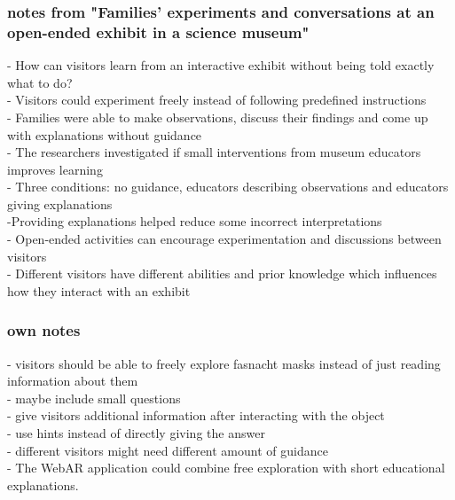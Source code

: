 \subsubsection{notes from "Families' experiments and conversations at an open-ended exhibit in a science museum"}
- How can visitors learn from an interactive exhibit without being told exactly what to do?
\\
- Visitors could experiment freely instead of following predefined instructions
\\
- Families were able to make observations, discuss their findings and come up with explanations without guidance
\\
- The researchers investigated if small interventions from museum educators improves learning
\\
- Three conditions: no guidance, educators describing observations and educators giving explanations
\\
-Providing explanations helped reduce some incorrect interpretations
\\
- Open-ended activities can encourage experimentation and discussions between visitors
\\
- Different visitors have different abilities and prior knowledge which influences how they interact with an exhibit
\\
\subsubsection{own notes}
- visitors should be able to freely explore fasnacht masks instead of just reading information about them
\\
- maybe include small questions
\\
- give visitors additional information after interacting with the object
\\
- use hints instead of directly giving the answer
\\
- different visitors might need different amount of guidance
\\
- The WebAR application could combine free exploration with short educational explanations.


